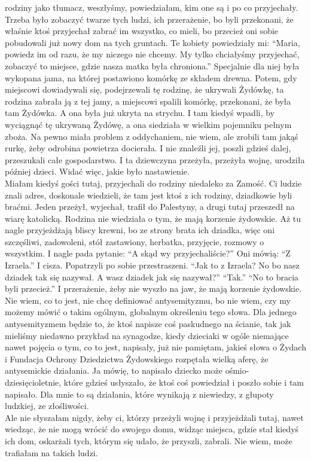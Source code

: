 rodziny jako tłumacz, weszłyśmy, powiedziałam, kim one są i po co przyjechały. Trzeba było zobaczyć twarze tych ludzi, ich przerażenie, bo byli przekonani, że właśnie ktoś przyjechał zabrać im wszystko, co mieli, bo przecież oni sobie pobudowali już nowy dom na tych gruntach. Te kobiety powiedziały mi: "`Maria, powiedz im od razu, że my niczego nie chcemy. My tylko chciałyśmy przyjechać, zobaczyć to miejsce, gdzie nasza matka była chroniona."' Specjalnie dla niej była wykopana jama, na której postawiono komórkę ze składem drewna. Potem, gdy miejscowi dowiadywali się, podejrzewali tę rodzinę, że ukrywali Żydówkę, ta rodzina zabrała ją z tej jamy, a miejscowi spalili komórkę, przekonani, że była tam Żydówka. A ona była już ukryta na strychu. I tam kiedyś wpadli, by wyciągnąć tę ukrywaną Żydówę, a ona siedziała w wielkim pojemniku pełnym zboża. Na pewno miała problem z oddychaniem, nie wiem, ale zrobili tam jakąś rurkę, żeby odrobina powietrza docierała. I nie znaleźli jej, poszli gdzieś dalej, przeszukali całe gospodarstwo. I ta dziewczyna przeżyła, przeżyła wojnę, urodziła później dzieci. Widać więc, jakie było nastawienie.\\
Miałam kiedyś gości tutaj, przyjechali do rodziny niedaleko za Zamość. Ci ludzie znali adres, doskonale wiedzieli, że tam jest ktoś z ich rodziny, dziadkowie byli braćmi. Jeden przeżył, wyjechał, trafił do Palestyny, a drugi tutaj przeszedł na wiarę katolicką. Rodzina nie wiedziała o tym, że mają korzenie żydowskie. Aż tu nagle przyjeżdżają bliscy krewni, bo ze strony brata ich dziadka, więc oni szczęśliwi, zadowoleni, stół zastawiony, herbatka, przyjęcie, rozmowy o wszystkim. I nagle pada pytanie: "`A skąd wy przyjechaliście?"' Oni mówią: "`Z Izraela."' I cisza. Popatrzyli po sobie przestraszeni. "`Jak to z Izraela? No bo nasz dziadek tak się nazywał. A wasz dziadek jak się nazywał?"' "`Tak."' "`No to bracia byli przecież."' I przerażenie, żeby nie wyszło na jaw, że mają korzenie żydowskie. Nie wiem, co to jest, nie chcę definiować antysemityzmu, bo nie wiem, czy my możemy mówić o takim ogólnym, globalnym określeniu tego słowa. Dla jednego antysemityzmem będzie to, że ktoś napisze coś paskudnego na ścianie, tak jak mieliśmy niedawno przykład na synagodze, kiedy dzieciaki w ogóle niemające nawet pojęcia o tym, co to jest, napisały, już nie pamiętam, jakieś słowa o Żydach i Fundacja Ochrony Dziedzictwa Żydowskiego rozpętała wielką aferę, że antysemickie działania. Ja mówię, to napisało dziecko może ośmio- dziesięcioletnie, które gdzieś usłyszało, że ktoś coś powiedział i poszło sobie i tam napisało. Dla mnie to są działania, które wynikają z niewiedzy, z głupoty ludzkiej, ze złośliwości.\\
Ale nie słyszałam nigdy, żeby ci, którzy przeżyli wojnę i przyjeżdżali tutaj, nawet wiedząc, że nie mogą wrócić do swojego domu, widząc miejsca, gdzie stał kiedyś ich dom, oskarżali tych, którym się udało, że przyszli, zabrali. Nie wiem, może trafiałam na takich ludzi.

